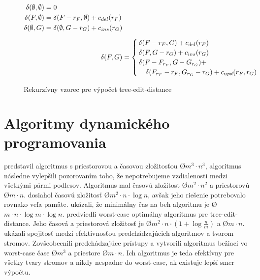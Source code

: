 \begin{figure}[H]
  \begin{subequations}
  \begin{align*}
    \begin{split}
    \delta(\emptyset, \emptyset) &=
      0
      \\
    \delta(F, \emptyset) &=
      \delta(F - r_{F}, \emptyset) + c_{del}(r_{F})
      \\
    \delta(\emptyset, G) &=
      \delta(\emptyset, G - r_{G}) + c_{ins}(r_{G})
    \end{split}
    \\[1ex]
    \delta(F, G) &=
      \begin{cases}
        \delta(F - r_{F}, G) + c_{del}(r_{F}) \\
        \delta(F, G - r_{G}) + c_{ins}(r_{G}) \\
        \delta(F - F_{r_{F}}, G - G_{r_{G}}) + \\
          \quad \delta(F_{r_{F}} - r_{F}, G_{r_{G}} - r_{G}) + c_{upd}(r_{F}, r_{G})
      \end{cases}
  \end{align*}
  \end{subequations}
  \caption{Rekurzívny vzorec pre výpočet tree-edit-distance}
  \label{eq:ted}
\end{figure}


\section{Algoritmy dynamického programovania}

\citet{TAI} predstavil algoritmus s priestorovou a časovou zložitosťou \O{$m^3 \cdot n^3$},
\citet{ZHANGSHASHA} algoritmus následne vylepšili pozorovaním toho, že nepotrebujeme
vzdialenosti medzi všetkými pármi podlesov. Algoritmus mal časovú zložitosť \O{$m^2 \cdot n^2$}
a priestorovú \O{$m \cdot n$}. \citet{KLEIN} dosiahol časovú zložitosť \O{$m^2 \cdot n \cdot \log{n}$},
avšak jeho riešenie potrebovalo rovnako veľa pamäte.
\citet{DALUCQ} ukázali, že minimálny čas na beh algoritmu je \O{$m \cdot n \cdot \log{m} \cdot \log{n}$}.
\citet{DMRW} predviedli worst-case optimálny algoritmus pre tree-edit-distance.
Jeho časová a priestorová zložitosť je \O{$m^2 \cdot n \cdot (1 + \log{\frac{n}{m}})$} a
\O{$m \cdot n$}. \citet{RTED} ukázali spojitosť medzi efektivnosťou predchádzajúcich algoritmov
a tvarom stromov. Zovšeobecnili predchádzajúce prístupy a vytvorili algoritmus bežiaci
vo worst-case čase \O{$m^3$} a priestore \O{$m \cdot n$}. Ich algoritmus je teda efektívny pre všetky
tvary stromov a nikdy nespadne do worst-case, ak existuje lepší smer výpočtu. 



